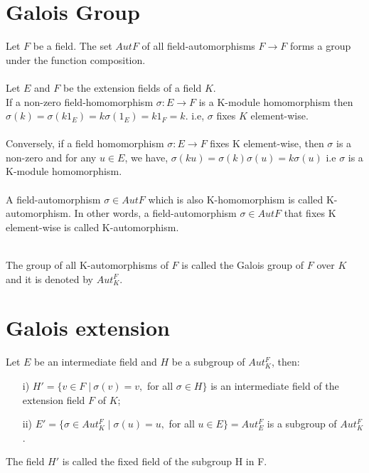 \section{Galois Group}
Let \(F\) be a field. The set \(AutF\) of all field-automorphisms \(F \rightarrow F \) forms a group under the function composition.\\ \\
Let \(E\) and \(F\) be the extension fields of a field \(K\).\\
If a non-zero field-homomorphism \(\sigma : E \rightarrow F\) is a K-module homomorphism then\\
\(\sigma(k)=\sigma(k1_E)=k\sigma(1_E)=k1_F=k\).\hspace{7mm}
i.e, \(\sigma\) fixes \(K\) element-wise.\\ \\
Conversely, if a field homomorphism \(\sigma : E \rightarrow F\) fixes K element-wise, then \(\sigma\) is a non-zero and for any \(u \in E\), we have, \(\sigma(ku)=\sigma(k)\sigma(u)=k\sigma(u)\)
i.e \(\sigma\) is a K-module homomorphism.\\ \\
A field-automorphism \(\sigma \in Aut F\) which is also K-homomorphism is called K-automorphism. In other words, a field-automorphism \(\sigma \in Aut F\) that fixes K element-wise is called K-automorphism.\\ \\
\begin{definition}
  The group of all K-automorphisms of \(F\) is called the Galois group of \(F\) over \(K\) and it is denoted by \(Aut_K^F\).
\end{definition}

\section{Galois extension}
Let \(E\) be an intermediate field and \(H\) be a subgroup of \(Aut_K^F\), then:
\begin{enumerate}
\item[i)] \(H' = \{v \in F \; | \: \sigma(v)=v,\) for all \(\sigma \in H \}\) is an intermediate field of the extension field \(F\) of \(K\);
\item[ii)] \(E' = \{\sigma \in Aut_K^F \; | \; \sigma(u)=u,\) for all \(u \in E\}=Aut_E^F\) is a subgroup of \(Aut_K^F\).
\end{enumerate}

The field \(H'\) is called the fixed field of the subgroup H in F.

